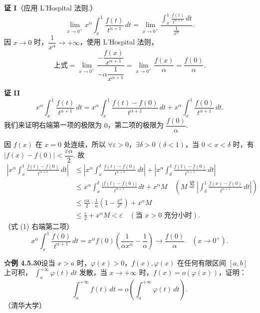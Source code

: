 \documentclass[UTF8,12pt,a4paper,fontset=fandol]{ctexart}
\begin{document}
\noindent\textbf{证 I}\quad （应用 L'Hospital 法则.）
\[
\lim_{x\to0^+}x^\alpha\int_x^1\frac{f(t)}{t^{\alpha+1}}\,dt
=\lim_{x\to0^+}
\frac{\displaystyle\int_x^1\frac{f(t)}{t^{\alpha+1}}\,dt}
{\displaystyle\frac1{x^\alpha}}.
\]
因 $x\to0$ 时，$\dfrac1{x^\alpha}\to+\infty$，使用 L'Hospital 法则，
\[
\text{上式}=\lim_{x\to0^+}
\frac{-\dfrac{f(x)}{x^{\alpha+1}}}
{-\alpha\dfrac1{x^{\alpha+1}}}
=\lim_{x\to0^+}\frac{f(x)}\alpha=\frac{f(0)}\alpha.
\]

\noindent\textbf{证 II}\quad
\[
x^\alpha\int_x^1\frac{f(t)}{t^{\alpha+1}}\,dt
=x^\alpha\int_x^1\frac{f(t)-f(0)}{t^{\alpha+1}}\,dt
+x^\alpha\int_x^1\frac{f(0)}{t^{\alpha+1}}\,dt. \tag{1}
\]
我们来证明右端第一项的极限为 $0$，第二项的极限为 $\dfrac{f(0)}\alpha$.

因 $f(x)$ 在 $x=0$ 处连续，所以 $\forall\varepsilon>0$，$\exists\delta>0\ (\delta<1)$，当 $0<x<\delta$ 时，有
$|f(x)-f(0)|<\dfrac{\varepsilon\alpha}2$. 故
\[
\begin{aligned}
\left|x^\alpha\int_x^1\frac{f(t)-f(0)}{t^{\alpha+1}}\,dt\right|
&\le\left|x^\alpha\int_x^\delta\frac{f(t)-f(0)}{t^{\alpha+1}}\,dt\right|
+\left|x^\alpha\int_\delta^1\frac{f(t)-f(0)}{t^{\alpha+1}}\,dt\right|\\
&\le x^\alpha\int_x^\delta\frac{|f(t)-f(0)|}{t^{\alpha+1}}\,dt+x^\alpha M
\quad\left(M\stackrel{\text{记}}{=}\left|\int_\delta^1\frac{f(x)-f(0)}{t^{\alpha+1}}\,dt\right|\right)\\
&\le\frac{\varepsilon\alpha}2\cdot\frac1\alpha\left(1-\frac{x^\alpha}{\delta^\alpha}\right)+x^\alpha M\\
&\le\frac\varepsilon2+x^\alpha M<\varepsilon\quad(\text{当 }x>0\text{ 充分小时}).
\end{aligned}
\]
（式 (1) 右端第二项）
\[
x^\alpha\int_x^1\frac{f(0)}{t^{\alpha+1}}\,dt
=x^\alpha f(0)\left(\frac1{\alpha x^\alpha}-\frac1\alpha\right)
\longrightarrow\frac{f(0)}\alpha\quad(x\to0^+).
\]

\noindent\textbf{☆例 4.5.30}\quad 设当 $x>a$ 时，$\varphi(x)>0$，$f(x),\varphi(x)$ 在任何有限区间 $[a,b]$ 上可积，
$\displaystyle\int_a^{+\infty}\varphi(t)\,dt$ 发散，当 $x\to+\infty$ 时，$f(x)=o(\varphi(x))$，证明：
\begin{equation}
\int_a^{+\infty}f(t)\,dt=o\left(\int_a^{+\infty}\varphi(t)\,dt\right).
\tag{1}
\end{equation}
（清华大学）
\end{document}
